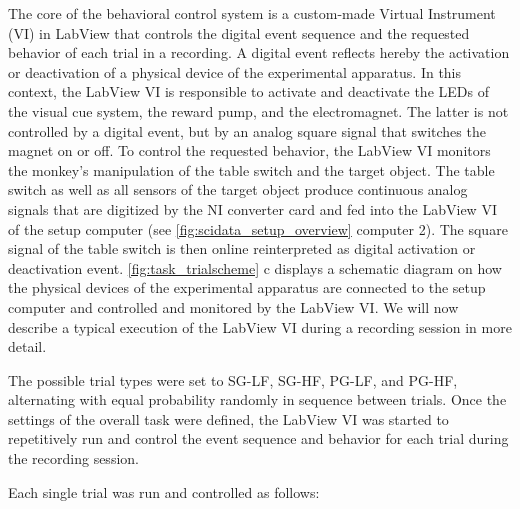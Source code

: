 The core of the behavioral control system is a custom-made Virtual Instrument (VI) in LabView that controls the digital event sequence and the requested behavior of each trial in a recording. A digital event reflects hereby the activation or deactivation of a physical device of the experimental apparatus. In this context, the LabView VI is responsible to activate and deactivate the LEDs of the visual cue system, the reward pump, and the electromagnet. The latter is not controlled by a digital event, but by an analog square signal that switches the magnet on or off. To control the requested behavior, the LabView VI monitors the monkey's manipulation of the table switch and the target object. The table switch as well as all sensors of the target object produce continuous analog signals that are digitized by the NI converter card and fed into the LabView VI of the setup computer (see \cref{fig:scidata_setup_overview} computer 2). The square signal of the table switch is then online reinterpreted as digital activation or deactivation event. \cref{fig:task_trialscheme} c displays a schematic diagram on how the physical devices of the experimental apparatus are connected to the setup computer and controlled and monitored by the LabView VI. We will now describe a typical execution of the LabView VI during a recording session in more detail. 

The possible trial types were set to SG-LF, SG-HF, PG-LF, and PG-HF, alternating with equal probability randomly in sequence between trials. Once the settings of the overall task were defined, the LabView VI was started to repetitively run and control the event sequence and behavior for each trial during the recording session. 

Each single trial was run and controlled as follows: 

